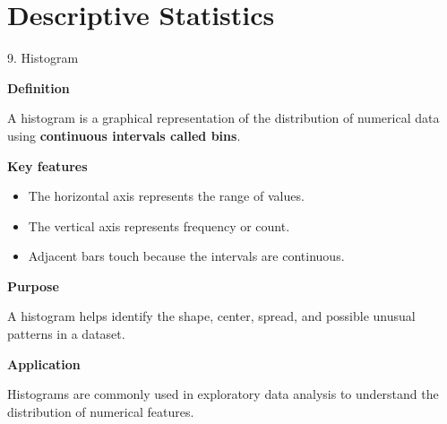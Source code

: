 
\section{Descriptive Statistics}


\begin{frame}{9. Histogram}

\textbf{Definition}

A histogram is a graphical representation of the distribution
of numerical data using \textbf{continuous intervals called bins}.

\vspace{0.1cm}

\textbf{Key features}

\begin{itemize}
    \item The horizontal axis represents the range of values.
    \item The vertical axis represents frequency or count.
    \item Adjacent bars touch because the intervals are continuous.
\end{itemize}

\vspace{0.1cm}

\textbf{Purpose}

A histogram helps identify the shape, center, spread, and
possible unusual patterns in a dataset.

\vspace{0.1cm}

\textbf{Application}

Histograms are commonly used in exploratory data analysis
to understand the distribution of numerical features.

\end{frame}


